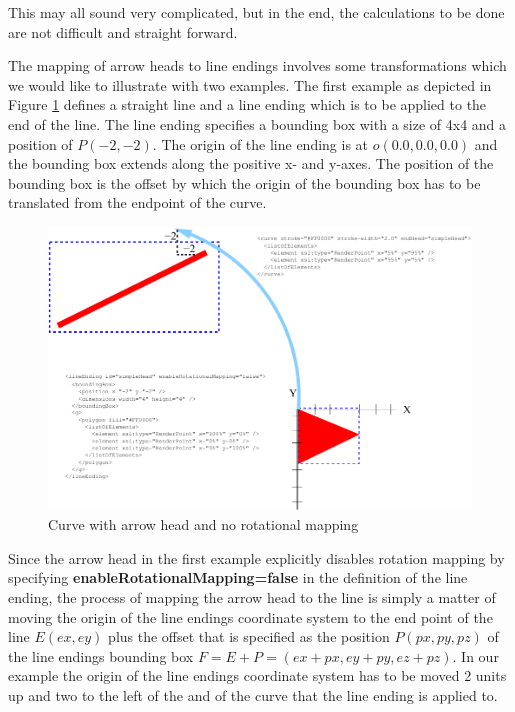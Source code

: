 This may all sound very complicated, but in the end, the calculations to be done are not difficult and straight forward. 

The mapping of arrow heads to line endings involves some transformations which we would like to illustrate with two examples.
The first example as depicted in Figure \ref{fig:2ArrowHeadMapping} defines a straight line and a line ending which is to be applied
to the end of the line. The line ending specifies a bounding box with a size of 4x4 and a position of $P(-2,-2)$. 
The origin of the line ending is at $o(0.0,0.0,0.0)$ and the bounding box extends along the positive x- and y-axes.
The position of the bounding box is the offset by which the origin of the bounding box has to be translated from the endpoint of the curve.

\begin{figure}[!ht]
\begin{center}
\includegraphics[scale=0.25]{figures/ArrowHeadMapping2}
\end{center}
\caption{Curve with arrow head and no rotational mapping} \label{fig:2ArrowHeadMapping}
\end{figure}

Since the arrow head in the first example explicitly disables rotation mapping by specifying \textbf{enableRotationalMapping=false}
in the definition of the line ending, the process of mapping the arrow head to the line is simply a matter of moving the origin of 
the line endings coordinate system to the end point of the line $E(ex,ey)$ plus the offset that is specified as the position $P(px,py,pz)$ of the line endings bounding box $F=E+P=(ex+px,ey+py,ez+pz)$. In our example the origin of the line endings coordinate system has to be moved 2 units up and two to the left of the and of the curve that the line ending is applied to.

